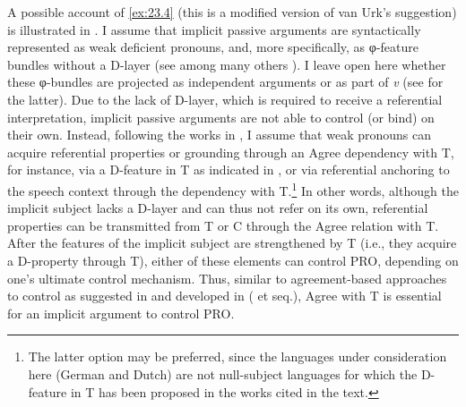\documentclass[output=paper]{langsci/langscibook}
\begin{document}
A possible account of \eqref{ex:23.4} (this is a modified version of van Urk’s
suggestion)\largerpage[2]\relax{} is illustrated in . I
assume that implicit passive arguments are syntactically
represented as weak deficient pronouns, and, more specifically, as
φ-feature bundles without a D-layer  (see among many others
\citealt{CarSta1999,DecWil2002,Landau2010,Roberts2010,Roberts2010c}). I leave
open here whether these φ-bundles are projected as independent arguments or as
part of \emph{v} (see \citealt{Legate2012,Legate2014} for the latter). Due to
the lack of D-layer, which is required to receive a referential interpretation,
implicit passive arguments are not able to control (or bind) on
their own.  Instead, following the works in \citet{BibHolRobShee2010}, I assume
that weak pronouns can acquire referential properties or grounding through an
Agree dependency with T, for instance, via a D-feature in T as indicated in
, or via referential anchoring to the speech context through
the dependency with T.\footnote{The latter option may be preferred, since the
languages under consideration here (German and Dutch) are not null-subject
languages for which the D-feature in T has been proposed in the works cited in
the text.} In other words, although the implicit subject lacks a D-layer and
can thus not refer on its own, referential properties can be transmitted from T
or C through the Agree relation with T. After the features of the implicit
subject are strengthened by T (i.e., they acquire a D-property through T),
either of these elements can control PRO, depending on one’s ultimate control
mechanism. Thus, similar to agreement-based approaches to control as suggested
in \citet{Borer1989} and developed in \citeauthor{Landau2000}
(\citeyear{Landau2000} et seq.), Agree with T is essential for an implicit
argument to control PRO.
\end{document}
